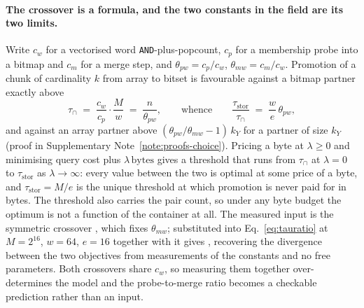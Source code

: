 \paragraph*{The crossover is a formula, and the two constants in the field are its two limits.}
Write $c_w$ for a vectorised word \texttt{AND}-plus-popcount, $c_p$ for a membership probe into a
bitmap and $c_m$ for a merge step, and $\theta_{pw}=c_p/c_w$, $\theta_{mw}=c_m/c_w$. Promotion of a
chunk of cardinality $k$ from array to bitset is favourable against a bitmap partner exactly above
\begin{equation}
\tau_{\cap} \;=\; \frac{c_w}{c_p}\cdot\frac{M}{w}\;=\;\frac{n}{\theta_{pw}},
\qquad\text{whence}\qquad
\frac{\tau_{\mathrm{stor}}}{\tau_{\cap}} \;=\; \frac{w}{e}\,\theta_{pw},
\label{eq:tauratio}
\end{equation}
and against an array partner above $(\theta_{pw}/\theta_{mw}-1)\,k_Y$ for a partner of size $k_Y$
(proof in Supplementary Note~\ref{note:proofs-choice}). Pricing a byte at $\lambda\ge0$ and minimising query cost plus
$\lambda\,\mathrm{bytes}$ gives a threshold that runs from $\tau_{\cap}$ at $\lambda=0$ to
$\tau_{\mathrm{stor}}$ as $\lambda\to\infty$: every value between the two is optimal at some price of a
byte, and $\tau_{\mathrm{stor}}=M/e$ is the unique threshold at which promotion is never paid for in
bytes. The threshold also carries the pair count, so under any byte budget the optimum is not a
function of the container at all. The measured input is the symmetric crossover , which fixes $\theta_{mw}$;
substituted into Eq.~\eqref{eq:tauratio} at $M=2^{16}$, $w=64$, $e=16$ together with  it gives , recovering the
divergence between the two objectives from measurements of the constants and no free parameters. Both
crossovers share $c_w$, so measuring them together over-determines the model and the probe-to-merge
ratio becomes a checkable prediction rather than an input.


